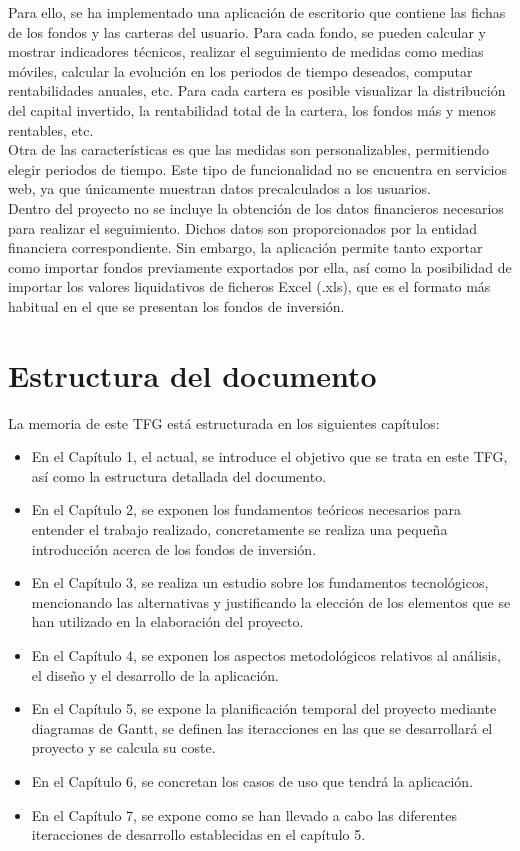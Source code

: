 \documentclass[12pt, a4paper]{book}
\begin{document}
Para ello, se ha implementado una aplicación de escritorio que contiene las fichas de los fondos y las carteras del usuario. Para cada fondo, se pueden calcular y mostrar indicadores técnicos, realizar el seguimiento de medidas como medias móviles, calcular la evolución en los periodos de tiempo deseados, computar rentabilidades anuales, etc. Para cada cartera es posible visualizar la distribución del capital invertido, la rentabilidad total de la cartera, los fondos más y menos rentables, etc.\\
 
Otra de las características es que las medidas son personalizables, permitiendo elegir periodos de tiempo. Este tipo de funcionalidad no se encuentra en servicios web, ya que únicamente muestran datos precalculados a los usuarios.\\


Dentro del proyecto no se incluye la obtención de los datos financieros necesarios para realizar el seguimiento. Dichos datos son proporcionados por la entidad financiera correspondiente. Sin embargo, la aplicación permite tanto exportar como importar fondos previamente exportados por ella, así como la posibilidad de importar los valores liquidativos de ficheros Excel (.xls), que es el formato más habitual en el que se presentan los fondos de inversión.\\

\newpage


\section{Estructura del documento}

La memoria de este \gls{TFG} está estructurada en los siguientes capítulos:

\begin{itemize}
	\item En el Capítulo 1, el actual, se introduce el objetivo que se trata en este TFG, así como la estructura detallada del documento.
	\item En el Capítulo 2, se exponen los fundamentos teóricos necesarios para entender el trabajo realizado, concretamente se realiza una pequeña introducción acerca de los fondos de inversión.
	\item En el Capítulo 3, se realiza un estudio sobre los fundamentos tecnológicos, mencionando las alternativas y justificando la elección de los elementos que se han utilizado en la elaboración del proyecto.
	\item En el Capítulo 4, se exponen los aspectos metodológicos relativos al análisis, el diseño y el desarrollo de la aplicación.
	\item En el Capítulo 5, se expone la planificación temporal del proyecto mediante diagramas de Gantt, se definen las iteracciones en las que se desarrollará el proyecto y se calcula su coste.
	\item En el Capítulo 6, se concretan los casos de uso que tendrá la aplicación.
	\item En el Capítulo 7, se expone como se han llevado a cabo las diferentes iteracciones de desarrollo establecidas en el capítulo 5.

\end{itemize}
\end{document}

